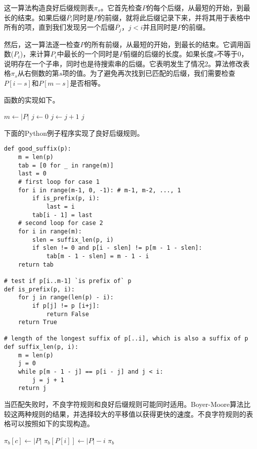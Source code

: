 \documentclass[UTF8]{article}
\begin{document}
这一算法构造良好后缀规则表$\pi_s$。它首先检查$P$的每个后缀，从最短的开始，到最长的结束。如果后缀$\overline{P_i}$同时是$P$的前缀，就将此后缀记录下来，并将其用于表格中所有的项，直到我们发现另一个后缀$\overline{P_j}$，$j < i$并且同时是$P$的前缀。

然后，这一算法逐一检查$P$的所有前缀，从最短的开始，到最长的结束。它调用函数($P_i$)，来计算$P_i$中最长的一个同时是$P$前缀的后缀的长度。如果长度$s$不等于0，说明存在一个子串，同时也是待搜索串的后缀。它表明发生了情况2。算法修改表格$\pi_s$从右侧数的第$s$项的值。为了避免再次找到已匹配的后缀，我们需要检查$P[i - s]$和$P[m - s]$是否相等。

函数的实现如下。

\begin{algorithmic}[1]
  \State $m \gets |P|$
  \State $j \gets 0$
    \State $j \gets j + 1$
  \EndWhile
  \State \Return $j$
\EndFunction
\end{algorithmic}

下面的Python例子程序实现了良好后缀规则。

\lstset{language=Python}
\begin{lstlisting}
def good_suffix(p):
    m = len(p)
    tab = [0 for _ in range(m)]
    last = 0
    # first loop for case 1
    for i in range(m-1, 0, -1): # m-1, m-2, ..., 1
        if is_prefix(p, i):
            last = i
        tab[i - 1] = last
    # second loop for case 2
    for i in range(m):
        slen = suffix_len(p, i)
        if slen != 0 and p[i - slen] != p[m - 1 - slen]:
            tab[m - 1 - slen] = m - 1 - i
    return tab

# test if p[i..m-1] `is prefix of` p
def is_prefix(p, i):
    for j in range(len(p) - i):
        if p[j] != p [i+j]:
            return False
    return True

# length of the longest suffix of p[..i], which is also a suffix of p
def suffix_len(p, i):
    m = len(p)
    j = 0
    while p[m - 1 - j] == p[i - j] and j < i:
        j = j + 1
    return j
\end{lstlisting}

当匹配失败时，不良字符规则和良好后缀规则可能同时适用。Boyer-Moore算法比较这两种规则的结果，并选择较大的平移值以获得更快的速度。不良字符规则的表格可以按照如下的实现构造。

\begin{algorithmic}[1]
    \State $\pi_b[c] \gets |P|$
  \EndFor
    \State $\pi_b[P[i]] \gets |P| - i$
  \EndFor
  \State \Return $\pi_b$
\EndFunction
\end{algorithmic}
\end{document}
